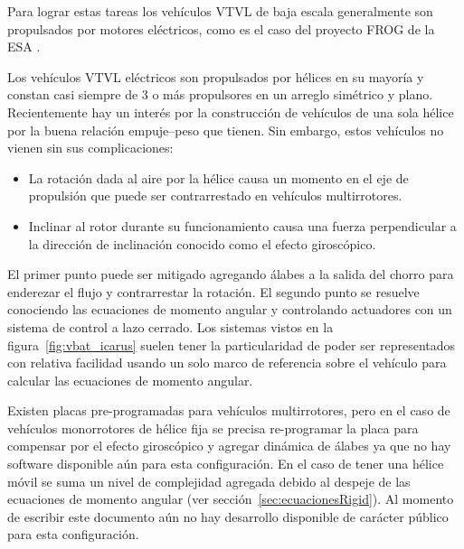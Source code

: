 Para lograr estas tareas los vehículos VTVL de baja escala generalmente son propulsados por motores eléctricos, como es el caso del proyecto FROG de la ESA \cite{rmili2019frog}.

\medskip

Los vehículos VTVL eléctricos son propulsados por hélices en su mayoría y constan casi siempre de 3 o más propulsores en un arreglo simétrico y plano. Recientemente hay un interés por la construcción de vehículos de una sola hélice por la buena relación empuje--peso que tienen. Sin embargo, estos vehículos no vienen sin sus complicaciones: 

\begin{itemize}
    \item La rotación dada al aire por la hélice causa un momento en el eje de propulsión que puede ser contrarrestado en vehículos multirrotores.
    \item Inclinar al rotor durante su funcionamiento causa una fuerza perpendicular a la dirección de inclinación conocido como el efecto giroscópico. 
\end{itemize}

El primer punto puede ser mitigado agregando álabes a la salida del chorro para enderezar el flujo y contrarrestar la rotación. El segundo punto se resuelve conociendo las ecuaciones de momento angular y controlando actuadores con un sistema de control a lazo cerrado. Los sistemas vistos en la figura~\ref{fig:vbat_icarus} suelen tener la particularidad de poder ser representados con relativa facilidad usando un solo marco de referencia sobre el vehículo para calcular las ecuaciones de momento angular.

\medskip

Existen placas pre-programadas para vehículos multirrotores, pero en el caso de vehículos monorrotores de hélice fija se precisa re-programar la placa para compensar por el efecto giroscópico y agregar dinámica de álabes ya que no hay software disponible aún para esta configuración. En el caso de tener una hélice móvil se suma un nivel de complejidad agregada debido al despeje de las ecuaciones de momento angular (ver sección~\ref{sec:ecuacionesRigid}). Al momento de escribir este documento aún no hay desarrollo disponible de carácter público para esta configuración.
